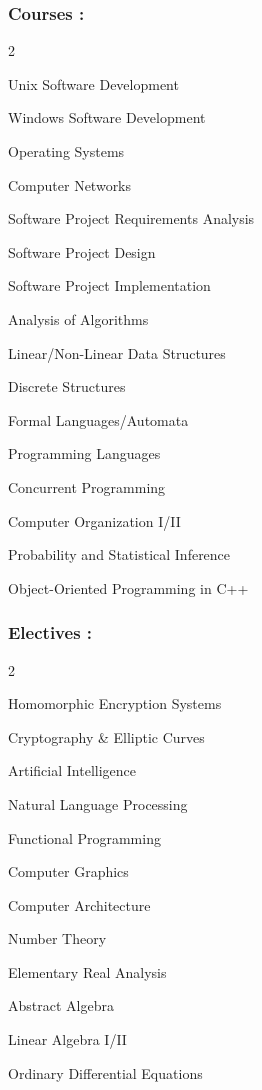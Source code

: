 \documentclass{article}
\newenvironment{mylist}[2]{
  \subsubsection*{#1}
  \begin{multicols}{#2}
  \small
  \begin{list}{}{}
   \setlength{\topsep}{0pt}
   \setlength{\itemsep}{1pt}
   \setlength{\parskip}{0pt}
   \setlength{\parsep}{0pt}}{\end{list}\end{multicols}\normalsize}
\begin{document}
\begin{mylist}{Courses :}{2}
\item Unix Software Development
\item Windows Software Development
\item Operating Systems
\item Computer Networks
\item Software Project Requirements Analysis
\item Software Project Design
\item Software Project Implementation
\item Analysis of Algorithms
\item Linear/Non-Linear Data Structures
\item Discrete Structures
\item Formal Languages/Automata
\item Programming Languages
\item Concurrent Programming
\item Computer Organization I/II
\item Probability and Statistical Inference
\item Object-Oriented Programming in C++
\end{mylist}

\begin{mylist}{Electives :}{2}
\item Homomorphic Encryption Systems
\item Cryptography \& Elliptic Curves
\item Artificial Intelligence
\item Natural Language Processing
\item Functional Programming
\item Computer Graphics
\item Computer Architecture
\item Number Theory
\item Elementary Real Analysis
\item Abstract Algebra
\item Linear Algebra I/II
\item Ordinary Differential Equations
\end{mylist}
\end{document}
